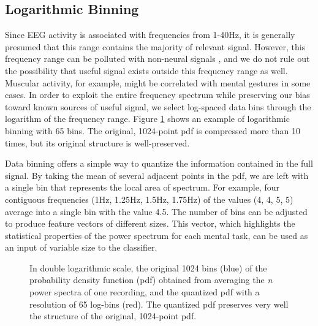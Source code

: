 \subsection{Logarithmic Binning}

Since EEG activity is associated with frequencies from 1-40Hz, it is generally presumed that this range contains the majority of relevant signal. However, this frequency range can be polluted with non-neural signals \cite{ball2009signal}, and we do not rule out the possibility that useful signal exists outside this frequency range as well. Muscular activity, for example, might be correlated with mental gestures in some cases. In order to exploit the entire frequency spectrum while preserving our bias toward known sources of useful signal, we select log-spaced data bins through the logarithm of the frequency range. Figure \ref{binnedEEGpowerspec} shows an example of logarithmic binning with 65 bins. The original, 1024-point pdf is compressed more than 10 times, but its original structure is well-preserved.

Data binning offers a simple way to quantize the information contained in the full signal. By taking the mean of several adjacent points in the pdf, we are left with a single bin that represents the local area of spectrum. For example, four contiguous frequencies (1Hz, 1.25Hz, 1.5Hz, 1.75Hz) of the values (4, 4, 5, 5) average into a single bin with the value 4.5. The number of bins can be adjusted to produce feature vectors of different sizes. This vector, which highlights the statistical properties of the power spectrum for each mental task, can be used as an input of variable size to the classifier.

\begin{figure}[!h]
  \vspace{-0.2cm}
  \centering
  {}
\caption{In double logarithmic scale, the original 1024 bins (blue) of the probability density function (pdf) obtained from averaging the \emph{n} power spectra of one recording, and the quantized pdf with a resolution of 65 log-bins (red). The quantized pdf preserves very well the structure of the original, 1024-point pdf. }
\label{binnedEEGpowerspec}
\vspace{-0.1cm}
\end{figure}



